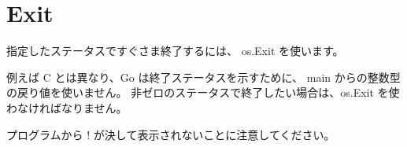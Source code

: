 \section{Exit}

指定したステータスですぐさま終了するには、 os.Exit を使います。



例えば C とは異なり、Go は終了ステータスを示すために、 main からの整数型の戻り値を使いません。 非ゼロのステータスで終了したい場合は、os.Exit を使わなければなりません。



プログラムから ! が決して表示されないことに注意してください。